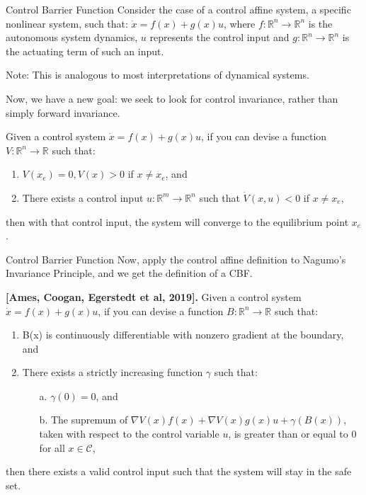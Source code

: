 \documentclass[aspectratio=169,xcolor=dvipsnames]{beamer}
\newcommand{\littlebreak}{\vspace{0.2cm}}
\begin{document}


\begin{frame}{Control Barrier Function   }
Consider the case of a control affine system, a specific nonlinear system, such that:
$\dot{x} = f(x) + g(x)u$, where $f: \mathbb R^n \to \mathbb R^n$ is the autonomous system dynamics, $u$ represents the control input and $g: \mathbb R^n \to \mathbb R^n$ is the actuating term of such an input.

Note: This is analogous to most interpretations of dynamical systems.

Now, we have a new goal: we seek to look for control invariance, rather than simply forward invariance.



    \begin{theorem}
        Given a control system $\dot{x} = f(x) + g(x)u$, if you can devise a function $V:\mathbb R^n \to \mathbb R$ such that: 
                \begin{enumerate}
        \item $V(x_e) = 0, V(x) > 0$ if $x \neq x_e$, and
        \littlebreak
        \item There exists a control input $u: \mathbb R^m \to \mathbb R^n$ such that $\dot{V}(x, u) < 0$ if $x \neq x_e$,
        \end{enumerate}
        then with that control input, the system will converge to the equilibrium point $x_e$.
    \end{theorem}
\end{frame}

\begin{frame}{Control Barrier Function}
Now, apply the control affine definition to Nagumo's Invariance Principle, and we get the definition of a CBF.

    \begin{theorem}
    {\bf [Ames, Coogan, Egerstedt et al, 2019].}
        Given a control system $\dot{x} = f(x) + g(x)u$, if you can devise a function $B: \mathbb R^n \to \mathbb R$ such that: 
        \begin{enumerate}
        \item B(x) is continuously differentiable with nonzero gradient at the boundary, and
        \item There exists a strictly increasing function $\gamma$ such that:
        \begin{itemize}
            \item [a.] $\gamma (0) = 0$, and
            \item [b.] The supremum of $\nabla{V(x)}f(x)+\nabla{V(x)}g(x)u + \gamma (B(x))$, taken with respect to the control variable $u$, is greater than or equal to $0$ for all $x \in \mathcal C$,
        \end{itemize} 
        \end{enumerate}
        then there exists a valid control input such that the system will stay in the safe set.
    \end{theorem}
\end{frame}
\end{document}
